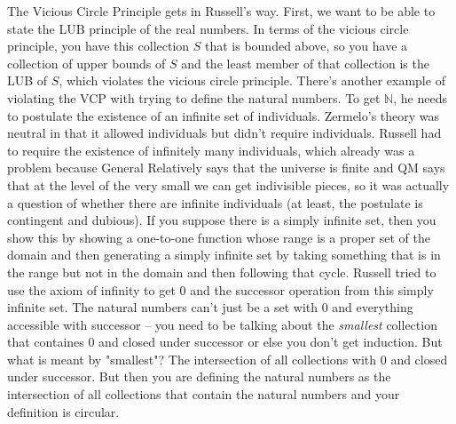 \documentclass[12pt]{article}
\theoremstyle{definition}
\begin{document}
\begin{itemize}
        The Vicious Circle Principle gets in Russell's way. First, we want to
        be able to state the LUB principle of the real numbers. In terms of the
        vicious circle principle, you have this collection $S$ that is bounded
        above, so you have a collection of upper bounds of $S$ and the least
        member of that collection is the LUB of $S$, which violates the vicious
        circle principle. There's another example of violating the VCP with
        trying to define the natural numbers. To get $\mathbb{N}$, he needs to
        postulate the existence of an infinite set of individuals. Zermelo's
        theory was neutral in that it allowed individuals but didn't require
        individuals. Russell had to require the existence of infinitely many
        individuals, which already was a problem because General Relatively
        says that the universe is finite and QM says that at the level of the
        very small we can get indivisible pieces, so it was actually a question
        of whether there are infinite individuals (at least, the postulate is
        contingent and dubious). If you suppose there is a simply infinite set,
        then you show this by showing a one-to-one function whose range is a
        proper set of the domain and then generating a simply infinite set by
        taking something that is in the range but not in the domain and then
        following that cycle. Russell tried to use the axiom of infinity to get
        0 and the successor operation from this simply infinite set. The
        natural numbers can't just be a set with 0 and everything accessible
        with successor -- you need to be talking about the \textit{smallest}
        collection that containes 0 and closed under successor or else you
        don't get induction. But what is meant by "smallest"? The intersection
        of all collections with 0 and closed under successor. But then you are
        defining the natural numbers as the intersection of all collections
        that contain the natural numbers and your definition is circular. 
\end{itemize}
\end{document}
